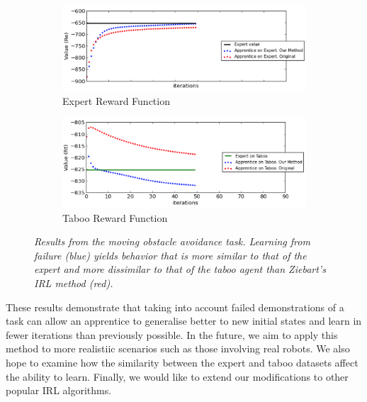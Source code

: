 \documentclass[conference]{IEEEtran}
\begin{document}
\begin{figure}[t]
  \centering
  \begin{subfigure}[b]{0.5\textwidth}
    \includegraphics[scale=0.4]{figures/resa.png}
    \caption{Expert Reward Function}
    \label{fig:res_a}
  \end{subfigure}
  \begin{subfigure}[b]{0.5\textwidth}
    \includegraphics[scale=0.4]{figures/resb.png}
        \caption{Taboo Reward Function}
    \label{fig:res_b}
\end{subfigure}
  \caption{\small{\textit{Results from the moving obstacle avoidance task.  Learning from failure (blue) yields behavior that is more similar to that of the expert and more dissimilar to that of the taboo agent than Ziebart's IRL method (red).}} }
  \label{fig:res}
\vspace{-4mm}
\end{figure}


These results demonstrate that taking into account failed demonstrations of a task can allow an apprentice to generalise better to new initial states and learn in fewer iterations than previously possible.  In the future, we aim to apply this method to more realistiic scenarios such as those involving real robots.  We also hope to examine how the similarity between the expert and taboo datasets affect the ability to learn. Finally, we would like to extend our modifications to other popular IRL algorithms.
\end{document}

